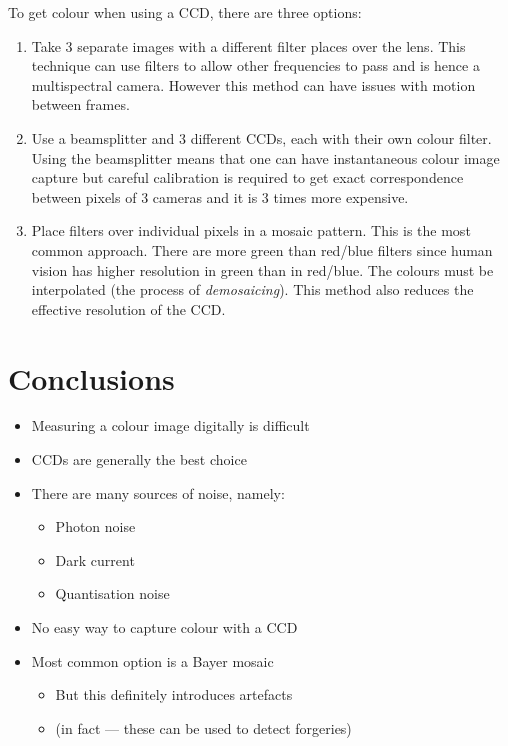 \documentclass{article}
\begin{document}
To get colour when using a CCD, there are three options:
\begin{enumerate}
	\item Take 3 separate images with a different filter places over the lens. This technique can use filters to allow other frequencies to pass and is hence a multispectral camera. However this method can have issues with motion between frames.
	\item Use a beamsplitter and 3 different CCDs, each with their own colour filter. Using the beamsplitter means that one can have instantaneous colour image capture but careful calibration is required to get exact correspondence between pixels of 3 cameras and it is 3 times more expensive.
	\item Place filters over individual pixels in a mosaic pattern. This is the most common approach. 
		There are more green than red/blue filters since human vision has higher resolution in green than in red/blue. 
		The colours must be interpolated (the process of {\it demosaicing}).
		This method also reduces the effective resolution of the CCD.
\end{enumerate}

\section{Conclusions}
\begin{itemize}
	\item Measuring a colour image digitally is difficult
	\item CCDs are generally the best choice
	\item There are many sources of noise, namely:
		\begin{itemize}
			\item Photon noise
			\item Dark current
			\item Quantisation noise
		\end{itemize}
	\item No easy way to capture colour with a CCD
	\item Most common option is a Bayer mosaic
		\begin{itemize}
			\item But this definitely introduces artefacts
			\item (in fact --- these can be used to detect forgeries)
		\end{itemize}
\end{itemize}
\end{document}
